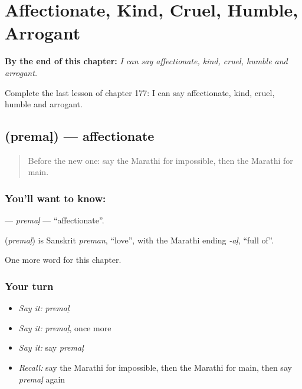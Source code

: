 
\chapter{Affectionate, Kind, Cruel, Humble, Arrogant}
\label{ch:mr-affectionate-kind-cruel-humble-arrogant}

\begin{chapteropening}
\textbf{By the end of this chapter:} \emph{I can say affectionate, kind, cruel, humble and arrogant.}

Complete the last lesson of chapter 177: I can say affectionate, kind, cruel, humble and arrogant.
\end{chapteropening}

\section[\texorpdfstring{\mr{प्रेमळ} (premaḷ)}{प्रेमळ (premaḷ)}]{ (premaḷ) — affectionate}

\label{lesson:MR-C177-premal}



\begin{quote}
Before the new one: say the Marathi for impossible, then the Marathi for main.
\end{quote}

\subsection*{You'll want to know: }
\textbf{} — \emph{premaḷ} — \textquotedblleft{}affectionate\textquotedblright{}.

\begin{cousinweb}
\textbf{} (\emph{premaḷ}) is Sanskrit \emph{preman}, \textquotedblleft{}love\textquotedblright{}, with the Marathi ending \emph{-aḷ}, \textquotedblleft{}full of\textquotedblright{}.
\end{cousinweb}

\begin{grammarlens}[title={What you've built}]
One more word for this chapter.
\end{grammarlens}

\subsection*{Your turn}
\begin{itemize}
\raggedright
  \item \emph{Say it:} \emph{premaḷ}
  \item \emph{Say it:} \emph{premaḷ}, once more
  \item \emph{Say it:} say \emph{premaḷ}
  \item \emph{Recall:} say the Marathi for impossible, then the Marathi for main, then say \emph{premaḷ} again
\end{itemize}

